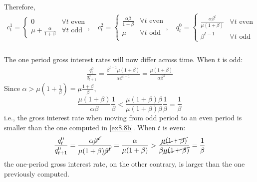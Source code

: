 \documentclass[]{article}
\begin{document}
Therefore,
\begin{equation}
	\begin{split}
	c_t^1 = \begin{cases}
	0 & \forall t\text{ even} \\
	\mu + \frac{\alpha}{1 + \beta} & \forall t\text{ odd}
	\end{cases}, \quad c_t^2 = \begin{cases}
	\frac{\alpha\beta}{1 + \beta} & \forall t\text{ even} \\
	\mu & \forall t\text{ odd} \\
	\end{cases}, \quad q_t^0 = \begin{cases}
	\frac{\alpha\beta^t}{\mu(1 + \beta)} & \forall t\text{ even} \\
	\beta^{t-1} & \forall t\text{ odd}
	\end{cases}\nonumber
	\end{split}
\end{equation}

\subsubsection{}

The one period gross interest rates will now differ across time. When $t$ is odd:
\begin{equation}
	\begin{split}
		\frac{q_{t}^0}{q_{t+1}^0} = \frac{\beta^{t-1}\mu(1 + \beta)}{\alpha\beta^{t+1}} = \frac{\mu(1 + \beta)}{\alpha\beta^{2}} \nonumber
	\end{split}
\end{equation}
Since $\alpha > \mu(1 + \frac{1}{\beta}) = \mu\frac{1 + \beta}{\beta}$,
\begin{equation}
	\frac{\mu(1 + \beta)}{\alpha\beta}\frac{1}{\beta} < \frac{\mu(1 + \beta)\beta}{\mu(1 + \beta)\beta}\frac{1}{\beta} = \frac{1}{\beta} \nonumber
\end{equation}
i.e., the gross interest rate when moving from odd period to an even period is smaller than the one computed in \cref{ex8.8b}.
When $t$ is even:
\begin{equation}
\begin{split}
\frac{q_{t}^0}{q_{t+1}^0} = \frac{\alpha\cancel{\beta^t}}{\mu(1 + \beta)\cancel{\beta^t}} = \frac{\alpha}{\mu(1 + \beta)} > \frac{\cancel{\mu(1 + \beta)}}{\beta\cancel{\mu(1 + \beta)}} = \frac{1}{\beta} \nonumber
\end{split}
\end{equation}
the one-period gross interest rate, on the other contrary, is larger than the one previously computed.
 
\end{document}
